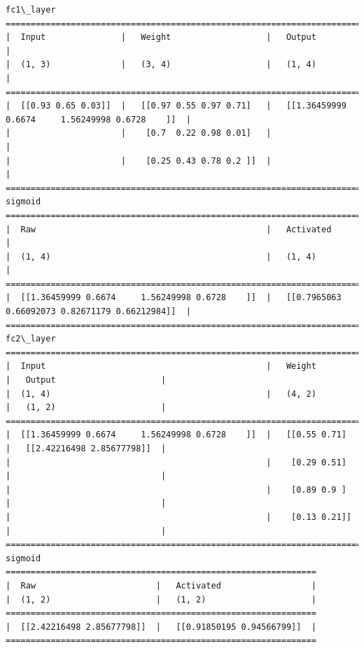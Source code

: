 \documentclass[11pt]{article}
\begin{document}
    \begin{Verbatim}[commandchars=\\\{\}]
fc1\_layer
==========================================================================================================
|  Input               |   Weight                   |   Output                                           |
|  (1, 3)              |   (3, 4)                   |   (1, 4)                                           |
==========================================================================================================
|  [[0.93 0.65 0.03]]  |   [[0.97 0.55 0.97 0.71]   |   [[1.36459999 0.6674     1.56249998 0.6728    ]]  |
|                      |    [0.7  0.22 0.98 0.01]   |                                                    |
|                      |    [0.25 0.43 0.78 0.2 ]]  |                                                    |
==========================================================================================================
sigmoid
==========================================================================================================
|  Raw                                              |   Activated                                        |
|  (1, 4)                                           |   (1, 4)                                           |
==========================================================================================================
|  [[1.36459999 0.6674     1.56249998 0.6728    ]]  |   [[0.7965063  0.66092073 0.82671179 0.66212984]]  |
==========================================================================================================
fc2\_layer
=======================================================================================================
|  Input                                            |   Weight         |   Output                     |
|  (1, 4)                                           |   (4, 2)         |   (1, 2)                     |
=======================================================================================================
|  [[1.36459999 0.6674     1.56249998 0.6728    ]]  |   [[0.55 0.71]   |   [[2.42216498 2.85677798]]  |
|                                                   |    [0.29 0.51]   |                              |
|                                                   |    [0.89 0.9 ]   |                              |
|                                                   |    [0.13 0.21]]  |                              |
=======================================================================================================
sigmoid
==============================================================
|  Raw                        |   Activated                  |
|  (1, 2)                     |   (1, 2)                     |
==============================================================
|  [[2.42216498 2.85677798]]  |   [[0.91850195 0.94566799]]  |
==============================================================

    \end{Verbatim}
\end{document}
